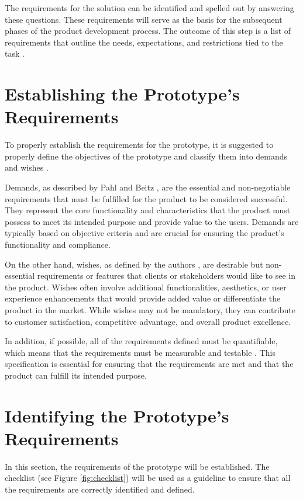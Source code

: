 The requirements for the solution can be identified and spelled out by answering these questions. These requirements will serve as the basis for the subsequent phases of the product development process. The outcome of this step is a list of requirements that outline the needs, expectations, and restrictions tied to the task \cite[145]{Pahl2007}.

\section{Establishing the Prototype's Requirements}
To properly establish the requirements for the prototype, it is suggested to properly define the objectives of the prototype and classify them into demands and wishes \cite[146]{Pahl2007}.

Demands, as described by Pahl and Beitz \cite[147]{Pahl2007}, are the essential and non-negotiable requirements that must be fulfilled for the product to be considered successful. They represent the core functionality and characteristics that the product must possess to meet its intended purpose and provide value to the users. Demands are typically based on objective criteria and are crucial for ensuring the product's functionality and compliance.

On the other hand, wishes, as defined by the authors \cite[147]{Pahl2007}, are desirable but non-essential requirements or features that clients or stakeholders would like to see in the product. Wishes often involve additional functionalities, aesthetics, or user experience enhancements that would provide added value or differentiate the product in the market. While wishes may not be mandatory, they can contribute to customer satisfaction, competitive advantage, and overall product excellence.

In addition, if possible, all of the requirements defined must be quantifiable, which means that the requirements must be measurable and testable \cite[147]{Pahl2007}. This specification is essential for ensuring that the requirements are met and that the product can fulfill its intended purpose.


\section{Identifying the Prototype's Requirements}
In this section, the requirements of the prototype will be established. The checklist (see Figure \ref{fig:checklist}) will be used as a guideline to ensure that all the requirements are correctly identified and defined.

